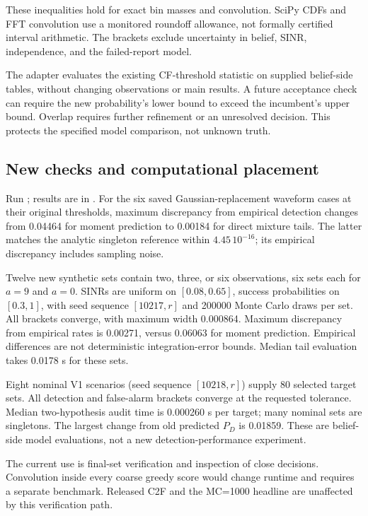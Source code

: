 \documentclass[10pt]{article}
\begin{document}
These inequalities hold for exact bin masses and convolution.
SciPy CDFs and FFT convolution use a monitored roundoff allowance, not
formally certified interval arithmetic. The brackets exclude uncertainty
in belief, SINR, independence, and the failed-report model.

The adapter evaluates the existing CF-threshold statistic on supplied
belief-side tables, without changing observations or main results.
A future acceptance check can require the new probability's lower bound
to exceed the incumbent's upper bound. Overlap requires further refinement
or an unresolved decision. This protects the specified model comparison,
not unknown truth.

\subsection{New checks and computational placement}
Run ; results are in
.
For the six saved Gaussian-replacement waveform cases at their original
thresholds, maximum discrepancy from empirical detection changes from
0.04464 for moment prediction to 0.00184 for direct mixture tails.
The latter matches the analytic singleton reference within $4.45\,10^{-16}$;
its empirical discrepancy includes sampling noise.

Twelve new synthetic sets contain two, three, or six observations,
six sets each for $a=9$ and $a=0$. SINRs are uniform on $[0.08,0.65]$,
success probabilities on $[0.3,1]$, with seed sequence $[10217,r]$ and
200000 Monte Carlo draws per set. All brackets converge, with maximum
width 0.000864. Maximum discrepancy from empirical rates is 0.00271,
versus 0.06063 for moment prediction. Empirical differences are not
deterministic integration-error bounds. Median tail evaluation takes
0.0178 s for these sets.

Eight nominal V1 scenarios (seed sequence $[10218,r]$) supply 80 selected
target sets. All detection and false-alarm brackets converge at the requested
tolerance. Median two-hypothesis audit time is 0.000260 s per target;
many nominal sets are singletons. The largest change from old predicted
$P_D$ is 0.01859. These are belief-side model evaluations, not a new
detection-performance experiment.

The current use is final-set verification and inspection of close decisions.
Convolution inside every coarse greedy score would change runtime and
requires a separate benchmark. Released C2F and the MC=1000 headline are
unaffected by this verification path.
\end{document}
